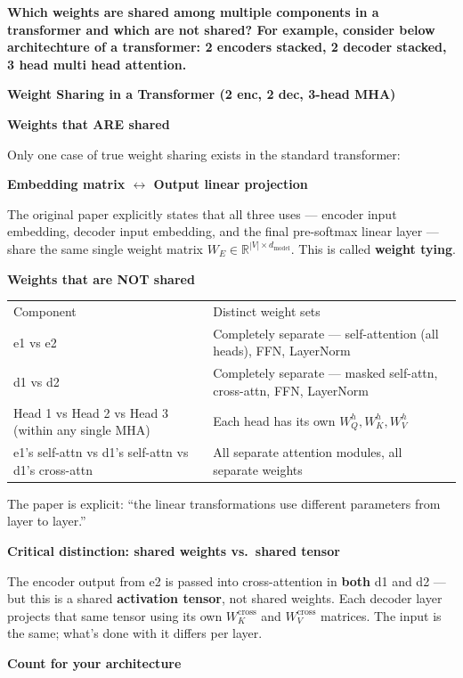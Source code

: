 \bigskip

\textbf{Which weights are shared among multiple components in a transformer and which are not shared? For example, consider below architechture of a transformer: 2 encoders stacked, 2 decoder stacked, 3 head multi head attention.}

\textbf{Weight Sharing in a Transformer (2 enc, 2 dec, 3-head MHA)}

\textbf{Weights that ARE shared}

Only one case of true weight sharing exists in the standard transformer:

\textbf{Embedding matrix $\leftrightarrow$ Output linear projection}

The original paper explicitly states that all three uses --- encoder input embedding, decoder input embedding, and the final pre-softmax linear layer --- share the same single weight matrix $W_E \in \mathbb{R}^{|V| \times d_{\text{model}}}$. This is called \textbf{weight tying}.

\textbf{Weights that are NOT shared}

\begin{tabular}{p{5.5cm} p{8.5cm}}
Component & Distinct weight sets \\[4pt]
e1 vs e2 & Completely separate --- self-attention (all heads), FFN, LayerNorm \\
d1 vs d2 & Completely separate --- masked self-attn, cross-attn, FFN, LayerNorm \\
Head 1 vs Head 2 vs Head 3 (within any single MHA) & Each head has its own $W_Q^h, W_K^h, W_V^h$ \\
e1's self-attn vs d1's self-attn vs d1's cross-attn & All separate attention modules, all separate weights \\
\end{tabular}

The paper is explicit: ``the linear transformations use different parameters from layer to layer.''

\textbf{Critical distinction: shared weights vs.\ shared tensor}

The encoder output from e2 is passed into cross-attention in \textbf{both} d1 and d2 --- but this is a shared \textbf{activation tensor}, not shared weights. Each decoder layer projects that same tensor using its own $W_K^{\text{cross}}$ and $W_V^{\text{cross}}$ matrices. The input is the same; what's done with it differs per layer.

\textbf{Count for your architecture}

